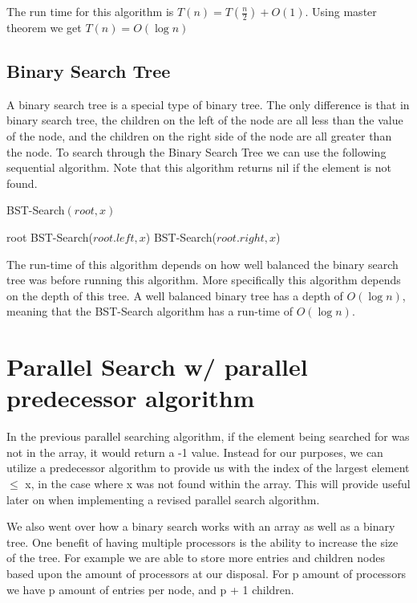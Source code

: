 \documentclass[11pt]{article}
\begin{document}
The run time for this algorithm is $T(n) = T(\frac{n}{2}) + O(1)$. Using master theorem we get $T(n) = O(\log n)$


\subsection{Binary Search Tree}
A binary search tree is a special type of binary tree. The only difference is that in binary search tree, the children on the left of the node are all less than the value of the node, and the children on the right side of the node are all greater than the node. To search through the Binary Search Tree we can use the following sequential algorithm. Note that this algorithm returns nil if the element is not found.

\begin{algorithm}
\caption{BST-Search$(root,x)$}
\begin{algorithmic}
    \RETURN root
    \RETURN BST-Search($root.left,x$)
\ELSE
    \RETURN BST-Search($root.right,x$)
\ENDIF
\end{algorithmic}
\end{algorithm}

The run-time of this algorithm depends on how well balanced the binary search tree was before running this algorithm. More specifically this algorithm depends on the depth of this tree. A well balanced binary tree has a depth of $O(\log n)$, meaning that the BST-Search algorithm has a run-time of $O(\log n)$.

\section{Parallel Search w/ parallel predecessor algorithm}
In the previous parallel searching algorithm, if the element being searched for was not in the array, it would return a -1 value. Instead for our purposes, we can utilize a predecessor algorithm to provide us with the index of the largest element $\leq$ x, in the case where x was not found within the array. This will provide useful later on when implementing a revised parallel search algorithm.

We also went over how a binary search works with an array as well as a binary tree. One benefit of having multiple processors is the ability to increase the size of the tree. For example we are able to store more entries and children nodes based upon the amount of processors at our disposal. For p amount of processors we have p amount of entries per node, and p + 1 children.
\end{document}
